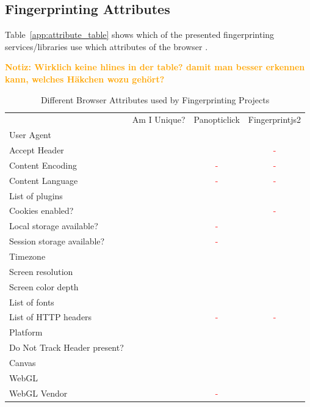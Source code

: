 \documentclass[
    fontsize=12pt,
    headings=small,
    parskip=half,
    bibliography=totoc,
    numbers=noenddot,
    open=any
    ]{scrreprt}
\newcommand{\dominik}[1]{\textcolor{orange}{\textbf{Notiz: #1}}}
\newcommand{\cmark}{\textcolor{green}{\ding{51}}}
\newcommand{\xmark}{\textcolor{red}{-}}
\begin{document}
\begin{appendices}

\chapter{Fingerprinting Attributes}

Table~\ref{app:attribute_table} shows which of the presented fingerprinting services/libraries use which attributes of the
browser \cite{am_i_unique,panopticlick,fingerprintjs2}.

\dominik{Wirklich keine hlines in der table? damit man besser erkennen kann, welches Häkchen wozu gehört?}

\renewcommand{\arraystretch}{1.2}
\begin{table}
\centering
\caption{Different Browser Attributes used by Fingerprinting Projects}
\begin{tabular}{ l c c c }
    \toprule
    & Am I Unique? & Panopticlick & Fingerprintjs2 \\
    User Agent & \cmark & \cmark & \cmark \\
    Accept Header & \cmark & \cmark & \xmark \\
    Content Encoding & \cmark & \xmark & \xmark \\
    Content Language & \cmark & \xmark & \xmark \\
    List of plugins & \cmark & \cmark & \cmark \\
    Cookies enabled? & \cmark & \cmark & \xmark \\
    Local storage available? & \cmark & \xmark & \cmark \\
    Session storage available? & \cmark & \xmark & \cmark \\
    Timezone & \cmark & \cmark & \cmark \\
    Screen resolution & \cmark & \cmark & \cmark \\
    Screen color depth & \cmark & \cmark & \cmark \\
    List of fonts & \cmark & \cmark & \cmark \\
    List of HTTP headers & \cmark & \xmark & \xmark \\
    Platform & \cmark & \cmark & \cmark \\
    Do Not Track Header present? & \cmark & \cmark & \cmark \\
    Canvas & \cmark & \cmark & \cmark \\
    WebGL & \cmark & \cmark & \cmark \\
    WebGL Vendor & \cmark & \xmark & \cmark \\

\end{tabular}
\end{table}
\end{appendices}
\end{document}
